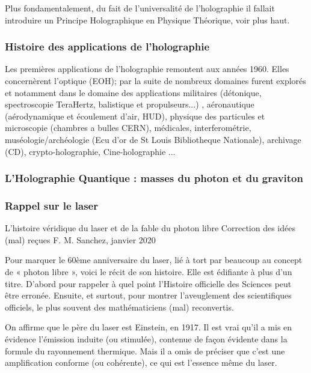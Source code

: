 \documentclass[a4paper,12pt]{article}
\begin{document}
Plus fondamentalement, du fait de l'universalité de l'holographie il fallait introduire un Principe Holographique en Physique Théorique, voir plus haut.




\subsubsection{Histoire des applications de l'holographie}

Les premières applications de l'holographie remontent aux années 1960. Elles concernèrent l'optique (EOH); par la suite de nombreux domaines furent explorés et notamment dans le domaine des applications militaires (détonique, spectroscopie TeraHertz, balistique et propulseurs...) \cite{ISL}, aéronautique (aérodynamique et écoulement d'air, HUD), physique des particules et microscopie (chambres a bulles CERN), médicales, interferométrie, muséologie/archéologie (Ecu d'or de St Louis Bibliotheque Nationale), archivage (CD), crypto-holographie, Cine-holographie \cite{Bjelkhagen} ...



\subsubsection{L'Holographie Quantique : masses du photon et du graviton}

\subsubsection{Rappel sur le laser}

L'histoire véridique du laser et de la fable du photon libre
Correction des idées (mal) reçues
F. M. Sanchez, janvier 2020

Pour marquer le 60ème anniversaire du laser, lié à tort par beaucoup au concept de « photon libre »,  voici le récit de son histoire. Elle est édifiante à plus d'un titre. D'abord pour rappeler à quel point l'Histoire officielle des Sciences peut être erronée. Ensuite, et surtout, pour montrer l'aveuglement des scientifiques officiels, le plus souvent des mathématiciens (mal) reconvertis.

On affirme que le père du laser est Einstein, en 1917. Il est vrai qu'il a mis en évidence l'émission induite (ou stimulée), contenue de façon évidente dans la formule du rayonnement thermique. Mais il a omis de préciser que c'est une amplification conforme (ou cohérente), ce qui est l'essence même du laser.
\end{document}
